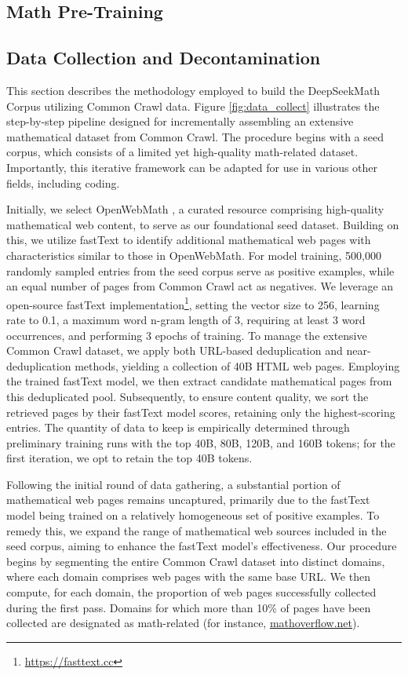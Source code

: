 \begin{itemize}[topsep=0pt]
\section{Math Pre-Training}

\subsection{Data Collection and Decontamination} This section describes the methodology employed to build the DeepSeekMath Corpus utilizing Common Crawl data. Figure \ref{fig:data_collect} illustrates the step-by-step pipeline designed for incrementally assembling an extensive mathematical dataset from Common Crawl. The procedure begins with a seed corpus, which consists of a limited yet high-quality math-related dataset. Importantly, this iterative framework can be adapted for use in various other fields, including coding.

Initially, we select OpenWebMath \citep{openwebmath}, a curated resource comprising high-quality mathematical web content, to serve as our foundational seed dataset. Building on this, we utilize fastText \citep{joulin2016fasttext} to identify additional mathematical web pages with characteristics similar to those in OpenWebMath. For model training, 500,000 randomly sampled entries from the seed corpus serve as positive examples, while an equal number of pages from Common Crawl act as negatives. We leverage an open-source fastText implementation\footnote{\url{https://fasttext.cc}}, setting the vector size to 256, learning rate to 0.1, a maximum word n-gram length of 3, requiring at least 3 word occurrences, and performing 3 epochs of training. To manage the extensive Common Crawl dataset, we apply both URL-based deduplication and near-deduplication methods, yielding a collection of 40B HTML web pages. Employing the trained fastText model, we then extract candidate mathematical pages from this deduplicated pool. Subsequently, to ensure content quality, we sort the retrieved pages by their fastText model scores, retaining only the highest-scoring entries. The quantity of data to keep is empirically determined through preliminary training runs with the top 40B, 80B, 120B, and 160B tokens; for the first iteration, we opt to retain the top 40B tokens.

Following the initial round of data gathering, a substantial portion of mathematical web pages remains uncaptured, primarily due to the fastText model being trained on a relatively homogeneous set of positive examples. To remedy this, we expand the range of mathematical web sources included in the seed corpus, aiming to enhance the fastText model’s effectiveness. Our procedure begins by segmenting the entire Common Crawl dataset into distinct domains, where each domain comprises web pages with the same base URL. We then compute, for each domain, the proportion of web pages successfully collected during the first pass. Domains for which more than 10\% of pages have been collected are designated as math-related (for instance, \url{mathoverflow.net}). 


\end{itemize}

